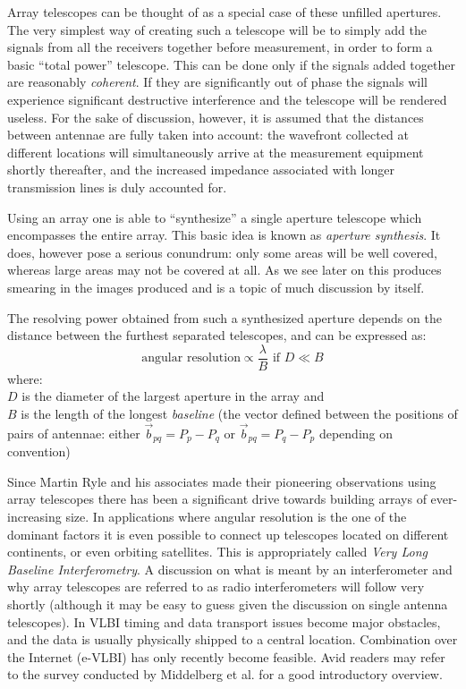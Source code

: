 \documentclass[a4paper,10pt]{report}
\begin{document}
Array telescopes can be thought of as a special case of these unfilled apertures. The very simplest way of creating such
a telescope will be to simply add the signals from all the receivers together before measurement, in order to form a 
basic ``total power'' telescope. This can be done only if the signals added together are reasonably \textit{coherent}. If they
are significantly out of phase the signals will experience significant destructive interference and the telescope will be
rendered useless. For the sake of discussion, however, it is assumed that the distances between antennae are fully taken 
into account: the wavefront collected at different locations will simultaneously arrive at the measurement equipment shortly 
thereafter, and the increased impedance associated with longer transmission lines is duly accounted for.

Using an array one is able to ``synthesize'' a single aperture telescope which encompasses the entire array. This
basic idea is known as \textit{aperture synthesis}. It does, however pose a serious conundrum: only some areas will be well covered, whereas
large areas may not be covered at all. As we see later on this produces smearing in the images produced and is a topic of much 
discussion by itself.

The resolving power obtained from such a synthesized aperture depends on the distance between the furthest separated 
telescopes, and can be expressed as:
\begin{equation*}
 \text{angular resolution} \propto \frac{\lambda}{B} \text{ if } D\ll B
\end{equation*}
where:\\
$D$ is the diameter of the largest aperture in the array and\\
$B$ is the length of the longest \textit{baseline} (the vector defined between the positions of pairs of antennae: 
either $\vec{b}_{pq}=P_p - P_q$ or $\vec{b}_{pq}=P_q - P_p$ depending on convention)

Since Martin Ryle and his associates made their pioneering observations using array telescopes there has been
a significant drive towards building arrays of ever-increasing size. In applications where angular resolution is
the one of the dominant factors it is even possible to connect up telescopes located on different continents, or even orbiting satellites.
This is appropriately called \textit{Very Long Baseline Interferometry}. A discussion on what is meant by an interferometer 
and why array telescopes are referred to as radio interferometers will follow very shortly (although it may be easy to guess given
the discussion on single antenna telescopes). In VLBI timing and data transport issues become major obstacles, and the data is usually 
physically shipped to a central location. Combination over the Internet (e-VLBI) has only recently become feasible. Avid readers may 
refer to the survey conducted by Middelberg et al. \cite{middelberg2008high} for a good introductory overview.
\end{document}
